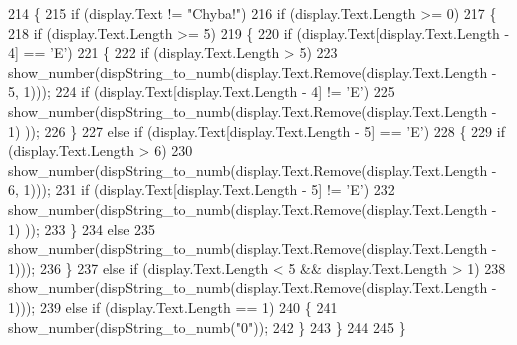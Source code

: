 \begin{DoxyCode}
214         \{
215             \textcolor{keywordflow}{if} (display.Text != \textcolor{stringliteral}{"Chyba!"})
216                 \textcolor{keywordflow}{if} (display.Text.Length >= 0)
217                 \{
218                     \textcolor{keywordflow}{if} (display.Text.Length >= 5)
219                     \{
220                         \textcolor{keywordflow}{if} (display.Text[display.Text.Length - 4] == \textcolor{charliteral}{'E'})
221                         \{
222                             \textcolor{keywordflow}{if} (display.Text.Length > 5)
223                                 show\_number(dispString\_to\_numb(display.Text.Remove(display.Text.Length - 5,
       1)));
224                                 \textcolor{keywordflow}{if} (display.Text[display.Text.Length - 4] != \textcolor{charliteral}{'E'})
225                                 show\_number(dispString\_to\_numb(display.Text.Remove(display.Text.Length - 1)
      ));
226                         \}
227                         \textcolor{keywordflow}{else} \textcolor{keywordflow}{if} (display.Text[display.Text.Length - 5] == \textcolor{charliteral}{'E'})
228                         \{
229                             \textcolor{keywordflow}{if} (display.Text.Length > 6)
230                                 show\_number(dispString\_to\_numb(display.Text.Remove(display.Text.Length - 6,
       1)));
231                                 \textcolor{keywordflow}{if} (display.Text[display.Text.Length - 5] != \textcolor{charliteral}{'E'})
232                                 show\_number(dispString\_to\_numb(display.Text.Remove(display.Text.Length - 1)
      ));
233                         \} 
234                         \textcolor{keywordflow}{else}
235                             show\_number(dispString\_to\_numb(display.Text.Remove(display.Text.Length - 1)));
236                     \}
237                     \textcolor{keywordflow}{else} \textcolor{keywordflow}{if} (display.Text.Length < 5 && display.Text.Length > 1)
238                         show\_number(dispString\_to\_numb(display.Text.Remove(display.Text.Length - 1)));
239                     \textcolor{keywordflow}{else} \textcolor{keywordflow}{if} (display.Text.Length == 1)
240                     \{
241                         show\_number(dispString\_to\_numb(\textcolor{stringliteral}{"0"}));
242                     \}
243                 \}
244             
245         \}
\end{DoxyCode}
\mbox{\label{classcalculator_1_1_calc_backend_a7b0b02fd9b36199f288b1b8be7b4f03d}} 
